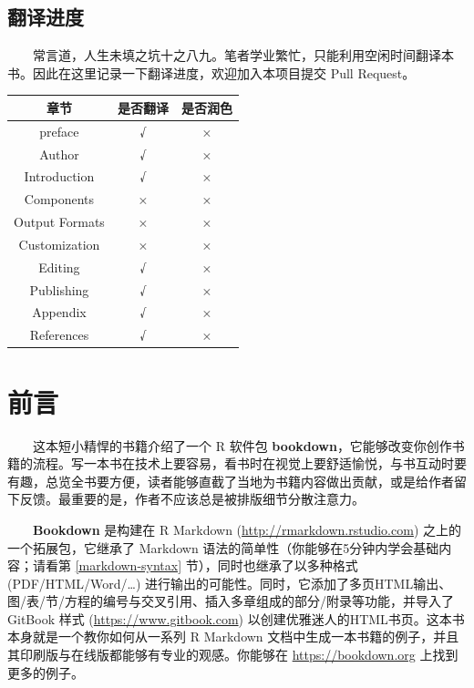 \documentclass[
  12pt,
]{krantz}
\theoremstyle{definition}
\theoremstyle{definition}
\theoremstyle{definition}
\theoremstyle{definition}
\theoremstyle{remark}
\begin{document}
\hypertarget{ux7ffbux8bd1ux8fdbux5ea6}{%
\section*{翻译进度}\label{ux7ffbux8bd1ux8fdbux5ea6}}


  常言道，人生未填之坑十之八九。笔者学业繁忙，只能利用空闲时间翻译本书。因此在这里记录一下翻译进度，欢迎加入本项目提交 Pull Request。

\begin{longtable}[]{@{}ccc@{}}
\toprule
章节 & 是否翻译 & 是否润色 \\
\midrule
\endhead
preface & √ & × \\
Author & √ & × \\
Introduction & √ & × \\
Components & × & × \\
Output Formats & × & × \\
Customization & × & × \\
Editing & √ & × \\
Publishing & √ & × \\
Appendix & √ & × \\
References & √ & × \\
\bottomrule
\end{longtable}

\hypertarget{ux524dux8a00}{%
\chapter*{前言}\label{ux524dux8a00}}


  这本短小精悍的书籍介绍了一个 R 软件包 \textbf{bookdown}，它能够改变你创作书籍的流程。写一本书在技术上要容易，看书时在视觉上要舒适愉悦，与书互动时要有趣，总览全书要方便，读者能够直截了当地为书籍内容做出贡献，或是给作者留下反馈。最重要的是，作者不应该总是被排版细节分散注意力。

  \textbf{Bookdown} 是构建在 R Markdown (\url{http://rmarkdown.rstudio.com}) 之上的一个拓展包，它继承了 Markdown 语法的简单性（你能够在5分钟内学会基础内容；请看第 \ref{markdown-syntax} 节），同时也继承了以多种格式 (PDF/HTML/Word/\ldots) 进行输出的可能性。同时，它添加了多页HTML输出、图/表/节/方程的编号与交叉引用、插入多章组成的部分/附录等功能，并导入了 GitBook 样式 (\url{https://www.gitbook.com}) 以创建优雅迷人的HTML书页。这本书本身就是一个教你如何从一系列 R Markdown 文档中生成一本书籍的例子，并且其印刷版与在线版都能够有专业的观感。你能够在 \url{https://bookdown.org} 上找到更多的例子。
\end{document}
